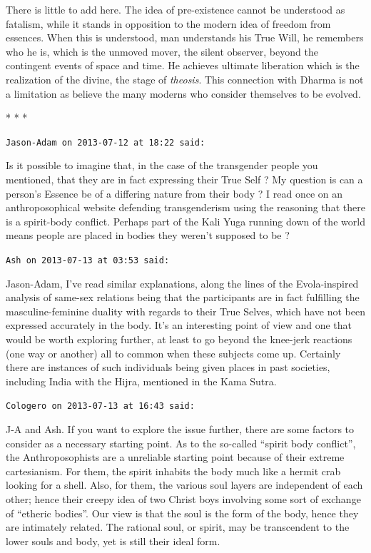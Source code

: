 There is little to add here. The idea of pre-existence cannot be understood as fatalism, while it stands in opposition to the modern idea of freedom from essences. When this is understood, man understands his True Will, he remembers who he is, which is the unmoved mover, the silent observer, beyond the contingent events of space and time. He achieves ultimate liberation which is the realization of the divine, the stage of \emph{theosis}. This connection with Dharma is not a limitation as believe the many moderns who consider themselves to be evolved.



\begin{center}* * *\end{center}

\begin{footnotesize}
\begin{sffamily}
\texttt{Jason-Adam on 2013-07-12 at 18:22 said:}

Is it possible to imagine that, in the case of the transgender people you mentioned, that they are in fact expressing their True Self ? My question is can a person's Essence be of a differing nature from their body ? I read once on an anthroposophical website defending transgenderism using the reasoning that there is a spirit-body conflict. Perhaps part of the Kali Yuga running down of the world means people are placed in bodies they weren't supposed to be ?

\hfill

\texttt{Ash on 2013-07-13 at 03:53 said:}

Jason-Adam, I've read similar explanations, along the lines of the Evola-inspired analysis of same-sex relations being that the participants are in fact fulfilling the masculine-feminine duality with regards to their True Selves, which have not been expressed accurately in the body. It's an interesting point of view and one that would be worth exploring further, at least to go beyond the knee-jerk reactions (one way or another) all to common when these subjects come up. Certainly there are instances of such individuals being given places in past societies, including India with the Hijra, mentioned in the Kama Sutra.

\hfill

\texttt{Cologero on 2013-07-13 at 16:43 said:}

J-A and Ash. If you want to explore the issue further, there are some factors to consider as a necessary starting point. As to the so-called ``spirit body conflict'', the Anthroposophists are a unreliable starting point because of their extreme cartesianism. For them, the spirit inhabits the body much like a hermit crab looking for a shell. Also, for them, the various soul layers are independent of each other; hence their creepy idea of two Christ boys involving some sort of exchange of ``etheric bodies''. Our view is that the soul is the form of the body, hence they are intimately related. The rational soul, or spirit, may be transcendent to the lower souls and body, yet is still their ideal form.


\end{sffamily}
\end{footnotesize}
